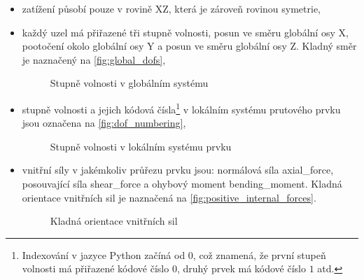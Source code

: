 \begin{itemize}
    \item zatížení působí pouze v rovině \gls{X}\gls{Z}, která je zároveň rovinou symetrie,
    \item každý uzel má přiřazené tři stupně volnosti, posun ve směru globální osy \gls{X}, pootočení okolo globální osy \gls{Y} a posun ve směru globální osy \gls{Z}. Kladný směr je naznačený na \autoref{fig:global_dofs},    
    \begin{figure}[H]
        
        \caption{Stupně volnosti v globálním systému}
        \label{fig:global_dofs}
    \end{figure}

    \item stupně volnosti a jejich kódová čísla\footnote{Indexování v jazyce Python začíná od $0$, což znamená, že první stupeň volnosti má přiřazené kódové číslo $0$, druhý prvek má kódové číslo $1$ atd.} v lokálním systému prutového prvku jsou označena na \autoref{fig:dof_numbering},
    
    \begin{figure}[H]
        
        \caption{Stupně volnosti v lokálním systému prvku}
        \label{fig:dof_numbering}
    \end{figure}

    \item vnitřní síly v jakémkoliv průřezu prvku jsou: normálová síla \gls{axial_force}, posouvající síla \gls{shear_force} a ohybový moment \gls{bending_moment}. Kladná orientace vnitřních sil je naznačená na \autoref{fig:positive_internal_forces}.
    \begin{figure}[H]
        
        \caption{Kladná orientace vnitřních sil}
        \label{fig:positive_internal_forces}
    \end{figure}
\end{itemize}

